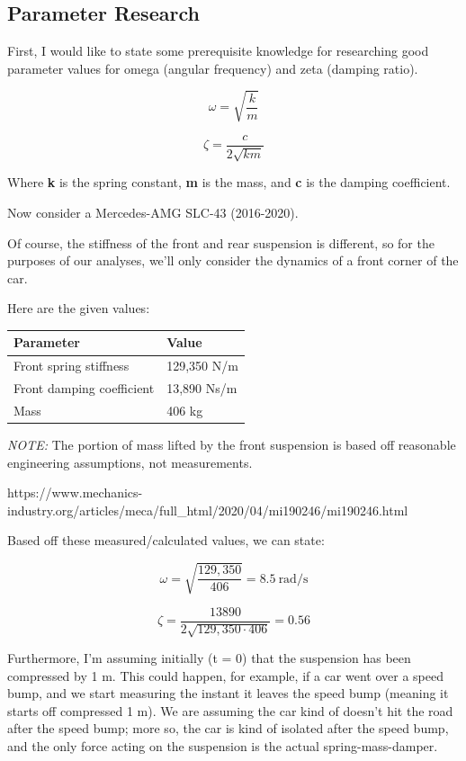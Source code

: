 \documentclass[11pt]{article}
\begin{document}
\subsection{Parameter Research}\label{parameter-research}

First, I would like to state some prerequisite knowledge for researching
good parameter values for omega (angular frequency) and zeta (damping
ratio).

\[\omega = \sqrt{\frac{k}{m}}\]

\[\zeta = \frac{c}{2\sqrt{km}}\]

Where \textbf{k} is the spring constant, \textbf{m} is the mass, and
\textbf{c} is the damping coefficient.

Now consider a Mercedes-AMG SLC-43 (2016-2020).

Of course, the stiffness of the front and rear suspension is different,
so for the purposes of our analyses, we'll only consider the dynamics of
a front corner of the car.

Here are the given values:

{\def\LTcaptype{none} %
\begin{longtable}[]{@{}ll@{}}
\toprule\noalign{}
Parameter & Value \\
\midrule\noalign{}
\endhead
\bottomrule\noalign{}
\endlastfoot
Front spring stiffness & 129,350 N/m \\
Front damping coefficient & 13,890 Ns/m \\
Mass & 406 kg \\
\end{longtable}
}

\emph{NOTE:} The portion of mass lifted by the front suspension is based
off reasonable engineering assumptions, not measurements.

https://www.mechanics-industry.org/articles/meca/full\_html/2020/04/mi190246/mi190246.html

Based off these measured/calculated values, we can state:

\[\omega = \sqrt{\frac{129{,}350}{406}} = 8.5 \ \text{rad/s}\]

\[\zeta = \frac{13890}{2\sqrt{129{,}350 \cdot 406}} = 0.56\]

Furthermore, I'm assuming initially (t = 0) that the suspension has been
compressed by 1 m. This could happen, for example, if a car went over a
speed bump, and we start measuring the instant it leaves the speed bump
(meaning it starts off compressed 1 m). We are assuming the car kind of
doesn't hit the road after the speed bump; more so, the car is kind of
isolated after the speed bump, and the only force acting on the
suspension is the actual spring-mass-damper.
\end{document}
